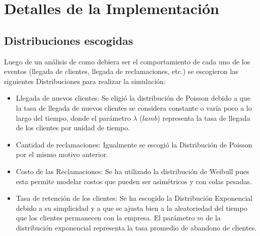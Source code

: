 \documentclass{article}
\begin{document}
\section{Detalles de la Implementación}

\subsection{Distribuciones escogidas}
Luego de un análisis de como debiera ser el comportamiento de cada uno de los eventos (llegada de clientes, llegada de reclamaciones, etc.) se escogieron las siguientes Distribuciones para realizar la simulación:
\begin{itemize}
    \item Llegada de nuevos clientes: Se eligió la distribución de Poisson debido a que la tasa de llegada de nuevos clientes se considera constante o varía poco a lo largo del tiempo, donde el parámetro $\lambda$ ($lamb$) representa la tasa de llegada de los clientes por unidad de tiempo.
    \item Cantidad de reclamaciones: Igualmente se escogió la Distribución de Poisson por el mismo motivo anterior.
    \item Costo de las Reclamaciones: Se ha utilizado la distribución de Weibull pues esta permite modelar costos que pueden ser asimétricos y con colas pesadas.
    \item Tasa de retención de los clientes: Se ha escogido la Distribución Exponencial debido a su simplicidad y a que se ajusta bien a la aleatoriedad del tiempo que los clientes permanecen con la empresa.
    El parámetro $m$ de la distribución exponencial representa la tasa promedio de abandono de clientes.

\end{itemize}
\end{document}
